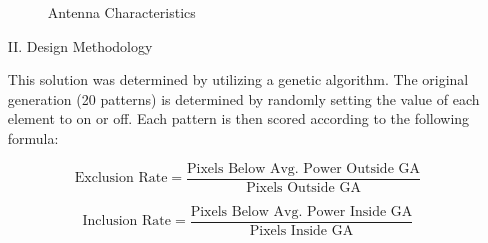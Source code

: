 \documentclass[12pt]{article}
\begin{document}
\begin{enumerate}
    \begin{figure}[!ht]
        \caption{Antenna Characteristics}
        \centering
    \end{figure}

    \newpage
    \hphantom{}
    \newpage

    \item[II.] Design Methodology
    
    This solution was determined by utilizing a genetic algorithm. The original generation (20 patterns)
    is determined by randomly setting the value of each element to on or off. Each pattern is then scored
    according to the following formula:

    \[\text{Exclusion Rate} = 
    \frac{\text{Pixels Below Avg. Power Outside GA}}{\text{Pixels Outside GA}}\]

    \[\text{Inclusion Rate} = 
    \frac{\text{Pixels Below Avg. Power Inside GA}}{\text{Pixels Inside GA}}\]


\end{enumerate}
\end{document}
